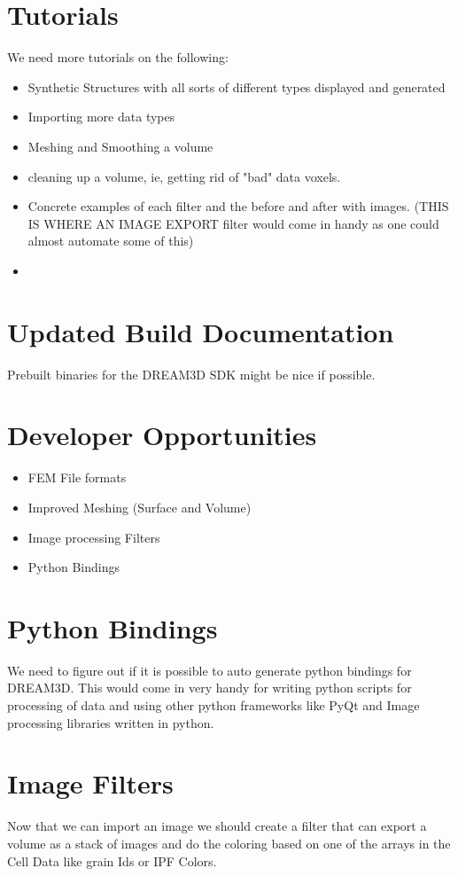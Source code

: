 \documentclass[12pt]{article} %
\begin{document}
\section{Tutorials}
  We need more tutorials on the following:
  \begin{itemize}
  \item Synthetic Structures with all sorts of different types displayed and generated
  \item Importing more data types
  \item Meshing and Smoothing a volume
  \item cleaning up a volume, ie, getting rid of "bad" data voxels.
  \item Concrete examples of each filter and the before and after with images. (THIS IS WHERE AN IMAGE EXPORT filter would come in handy as one could almost automate some of this)
  \item 
  \end{itemize}


\section{Updated Build Documentation}
  Prebuilt binaries for the DREAM3D SDK might be nice if possible.
  
\section{Developer Opportunities}
  \begin{itemize}
  \item FEM File formats
  \item Improved Meshing (Surface and Volume)
  \item Image processing Filters
  \item Python Bindings
  \end{itemize}
  
\section{Python Bindings}
  We need to figure out if it is possible to auto generate python bindings for DREAM3D. This would come in very handy for writing python scripts for processing of data and using other python frameworks like PyQt and Image processing libraries written in python.

\section{Image Filters}
   Now that we can import an image we should create a filter that can export a volume as a stack of images and do the coloring based on one of the arrays in the Cell Data like grain Ids or IPF Colors.
\end{document}
